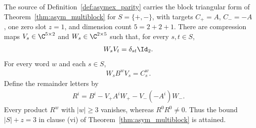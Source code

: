 \begin{theorem}
    \label{thm:asymex_parity_compression}
    \leanok
    The source of Definition~\ref{def:asymex_parity} carries the block
    triangular form of Theorem~\ref{thm:asym_multiblock} for
    $S=\{+,-\}$, with targets $C_+=A$, $C_-=-A$, one zero slot
    $z=1$, and dimension count $5=2+2+1$.
    There are compression maps $V_s\in\C^{5\times2}$ and
    $W_s\in\C^{2\times5}$ such that, for every $s,t\in S$,
    \begin{align}
        W_sV_t=\delta_{st}\Id_2.
        \label{eq:asymex_parity_biorthogonal}
    \end{align}
    For every word $w$ and each $s\in S$,
    \begin{align}
        W_sB^wV_s=C_s^w.
        \label{eq:asymex_parity_reduction}
    \end{align}
    Define the remainder letters by
    \begin{align}
        R^i=B^i-V_+A^iW_+-V_-(-A^i)W_-.
        \label{eq:asymex_parity_remainder}
    \end{align}
    Every product $R^w$ with $|w|\geq3$ vanishes, whereas
    $R^0R^0\neq0$. Thus the bound $|S|+z=3$ in clause (vi) of
    Theorem~\ref{thm:asym_multiblock} is attained.
\end{theorem}

